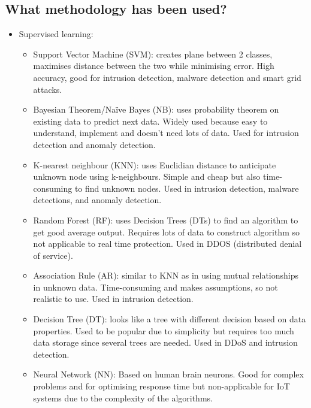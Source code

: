 \documentclass[11pt,a4paper]{article}
\begin{document}
\subsection*{What methodology has been used?}

\begin{itemize}
    \item Supervised learning:
        \begin{itemize}
            \item Support Vector Machine (SVM): creates plane between 2 classes, maximises distance between the two while minimising error. High accuracy, good for intrusion detection, malware detection and smart grid attacks. 
            
            \item Bayesian Theorem/Naïve Bayes (NB):  uses probability theorem on existing data to predict next data. Widely used because easy to understand, implement and doesn’t need lots of data. Used for intrusion detection and anomaly detection. 
            
            \item K-nearest neighbour (KNN): uses Euclidian distance to anticipate unknown node using k-neighbours. Simple and cheap but also time-consuming to find unknown nodes. Used in intrusion detection, malware detections, and anomaly detection. 
            
            \item Random Forest (RF): uses Decision Trees (DTs) to find an algorithm to get good average output. Requires lots of data to construct algorithm so not applicable to real time protection. Used in DDOS (distributed denial of service). 
            
            \item Association Rule (AR): similar to KNN as in using mutual relationships in unknown data. Time-consuming and makes assumptions, so not realistic to use. Used in intrusion detection.  
            
            \item Decision Tree (DT): looks like a tree with different decision based on data properties. Used to be popular due to simplicity but requires too much data storage since several trees are needed. Used in DDoS and intrusion detection. 
            
            \item Neural Network (NN): Based on human brain neurons. Good for complex problems and for optimising response time but non-applicable for IoT systems due to the complexity of the algorithms. 
            

\end{itemize}
\end{itemize}
\end{document}
